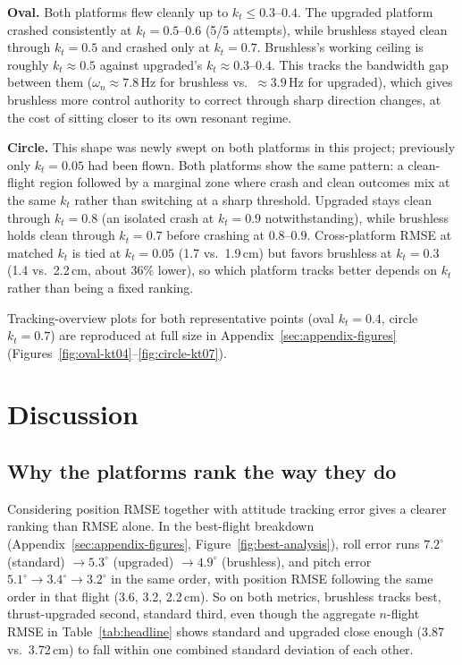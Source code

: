 \documentclass[11pt,a4paper]{article}
\begin{document}
\textbf{Oval.} Both platforms flew cleanly up to $k_t\le0.3$--$0.4$. The upgraded platform
crashed consistently at $k_t=0.5$--$0.6$ (5/5 attempts), while brushless stayed clean through
$k_t=0.5$ and crashed only at $k_t=0.7$. Brushless's working ceiling is roughly $k_t\approx0.5$
against upgraded's $k_t\approx0.3$--$0.4$. This tracks the bandwidth gap between them
($\omega_n\approx7.8\,\mathrm{Hz}$ for brushless vs.\ $\approx3.9\,\mathrm{Hz}$ for upgraded),
which gives brushless more control authority to correct through sharp direction changes, at the
cost of sitting closer to its own resonant regime.

\textbf{Circle.} This shape was newly swept on both platforms in this project; previously only
$k_t=0.05$ had been flown. Both platforms show the same pattern: a clean-flight region followed
by a marginal zone where crash and clean outcomes mix at the same $k_t$ rather than switching at
a sharp threshold. Upgraded stays clean through $k_t=0.8$ (an isolated crash at $k_t=0.9$ notwithstanding), while
brushless holds clean through $k_t=0.7$ before crashing at $0.8$--$0.9$. Cross-platform RMSE at
matched $k_t$ is tied at $k_t=0.05$ (1.7 vs.\
1.9\,cm) but favors brushless at $k_t=0.3$ (1.4 vs.\ 2.2\,cm, about 36\% lower), so which platform
tracks better depends on $k_t$ rather than being a fixed ranking.

Tracking-overview plots for both representative points (oval $k_t=0.4$, circle $k_t=0.7$) are
reproduced at full size in Appendix~\ref{sec:appendix-figures}
(Figures~\ref{fig:oval-kt04}--\ref{fig:circle-kt07}).

\section{Discussion}

\subsection{Why the platforms rank the way they do}

Considering position RMSE together with attitude tracking error gives a clearer ranking than
RMSE alone. In the best-flight breakdown (Appendix~\ref{sec:appendix-figures},
Figure~\ref{fig:best-analysis}), roll error runs $7.2^\circ$ (standard) $\to 5.3^\circ$
(upgraded) $\to 4.9^\circ$ (brushless), and pitch error $5.1^\circ \to 3.4^\circ \to 3.2^\circ$ in
the same order, with position RMSE following the same order in that flight (3.6, 3.2, 2.2\,cm).
So on both metrics, brushless tracks best, thrust-upgraded second, standard third, even though
the aggregate $n$-flight RMSE in Table~\ref{tab:headline} shows standard and upgraded close
enough (3.87 vs.\ 3.72\,cm) to fall within one combined standard deviation of each other.
\end{document}
